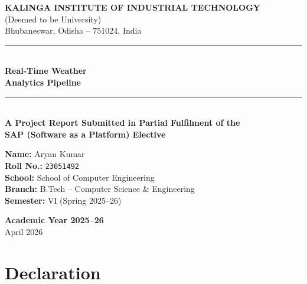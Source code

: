 \documentclass[12pt,a4paper]{report}
\begin{document}
\begin{titlepage}
  \centering
  \vspace*{0.5cm}

  {\LARGE\bfseries\color{kiitblue} KALINGA INSTITUTE OF INDUSTRIAL TECHNOLOGY}\\[0.3cm]
  {\large (Deemed to be University)}\\[0.1cm]
  {\large Bhubaneswar, Odisha -- 751024, India}\\[1cm]

  \rule{\textwidth}{1.5pt}\\[0.5cm]

  {\Huge\bfseries\color{kiitblue!90!black}
    Real-Time Weather\\[0.3cm]
    Analytics Pipeline}\\[0.5cm]

  \rule{\textwidth}{1.5pt}\\[0.8cm]

  {\large\bfseries A Project Report Submitted in Partial Fulfilment of the\\[0.2cm]
  SAP (Software as a Platform) Elective}\\[1.2cm]

  \begin{tcolorbox}[infobox, title=Submitted By, width=0.65\textwidth]
    \begin{center}
      \textbf{Name:} Aryan Kumar\\[0.3cm]
      \textbf{Roll No.:} \texttt{23051492}\\[0.3cm]
      \textbf{School:} School of Computer Engineering\\[0.3cm]
      \textbf{Branch:} B.Tech -- Computer Science \& Engineering\\[0.3cm]
      \textbf{Semester:} VI (Spring 2025--26)
    \end{center}
  \end{tcolorbox}

  \vfill

  {\large\bfseries Academic Year 2025--26}\\[0.5cm]
  {\large April 2026}

\end{titlepage}

\chapter*{Declaration}
\end{document}
